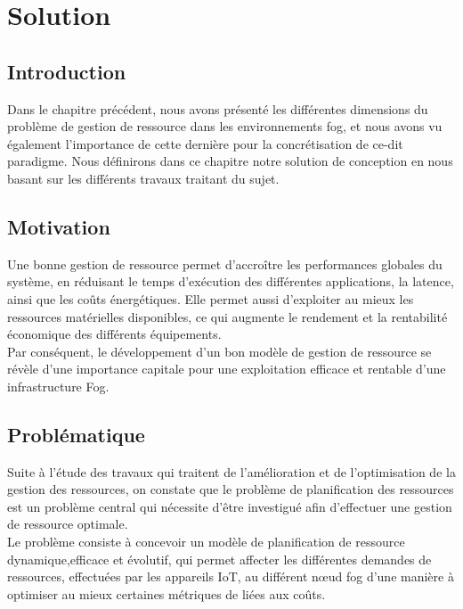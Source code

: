 \chapter{Solution}
\section{Introduction}
Dans le chapitre précédent, nous avons présenté les différentes dimensions du problème de gestion de ressource dans les environnements fog, et nous avons vu également l’importance de cette dernière pour la concrétisation de ce-dit paradigme.
Nous définirons dans ce chapitre notre solution de conception en nous basant sur les différents travaux traitant du sujet.
\section{Motivation}
Une bonne gestion de ressource permet d'accroître les performances globales du système, en réduisant le temps d'exécution des différentes applications, la latence, ainsi que les coûts énergétiques. Elle permet aussi d’exploiter au mieux les ressources matérielles disponibles, ce qui augmente le rendement et la rentabilité économique des différents équipements.\\ 
Par conséquent, le développement d’un bon modèle de gestion de ressource se révèle d’une importance capitale pour une exploitation efficace et rentable d’une infrastructure Fog.
\section{Problématique}
Suite à l’étude des travaux qui traitent de l’amélioration et de l’optimisation de la gestion des ressources, on constate que le problème de planification des ressources est un problème central qui nécessite d'être investigué afin d’effectuer une gestion de ressource optimale. \\
Le problème consiste à concevoir un modèle de planification de ressource dynamique,efficace et évolutif, qui permet affecter les différentes demandes de ressources, effectuées par les appareils IoT, au différent nœud fog d’une manière à optimiser au mieux certaines métriques de liées aux coûts.
